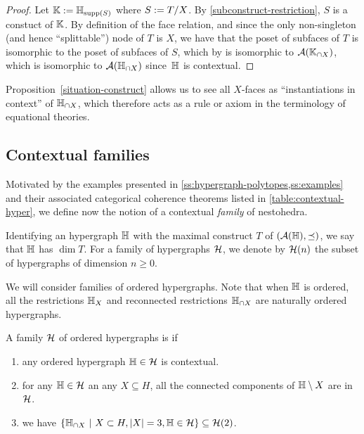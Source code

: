 \begin{proof} 
  Let ${\mathbb K}:={\mathbb H}_{\operatorname{supp}(S)}$ where $S:=T/X$. 
  By \cref{subconstruct-restriction}, $S$ is a constuct of ${\mathbb K}$. By definition of the face relation, and since the only non-singleton (and hence ``splittable'') node of $T$ is $X$, we have that the poset of subfaces of $T$ is isomorphic to the poset of subfaces of $S$, which by  is isomorphic to ${\cal A}({\mathbb K}_{\cap X})$, which is isomorphic to ${\cal A}({\mathbb H}_{\cap X})$ since~${\mathbb H}$ is contextual.
\end{proof}

Proposition~\ref{situation-construct} allows us to see all $X$-faces as ``instantiations in context'' of ${\mathbb H}_{\cap X}$, which therefore acts  as a rule or axiom in the terminology of equational theories.



\subsection{Contextual families}

Motivated by the examples presented in \cref{ss:hypergraph-polytopes,ss:examples} and their associated categorical coherence theorems listed in \cref{table:contextual-hyper}, we define now the notion of a contextual \emph{family} of nestohedra.

Identifying an hypergraph ${\mathbb H}$ with the maximal construct $T$ of $({\cal A}({\mathbb H}),\preceq)$, we say that ${\mathbb H}$ has  $\dim T$.
For a family of hypergraphs $\mathcal{H}$, we denote by $\mathcal{H}(n)$ the subset of hypergraphs of dimension $n \geq 0$.

We will consider families of ordered hypergraphs. 
Note that when ${\mathbb H}$ is ordered, all the restrictions ${\mathbb H}_X$ and reconnected restrictions ${\mathbb H}_{\cap X}$ are naturally ordered hypergraphs.

\begin{definition}
  \label{def:contextual-family}
    A family $\mathcal{H}$ of ordered hypergraphs is  if 
    \begin{enumerate}
      \item any ordered hypergraph ${\mathbb H} \in \mathcal{H}$ is contextual.
      \item for any ${\mathbb H} \in \mathcal{H}$ an any $X \subseteq H$, all the connected components of ${\mathbb H}\setminus X$ are in $\mathcal{H}$.
      \item we have $\{{\mathbb H}_{\cap X} \ | \ X \subset H, |X|=3, {\mathbb H} \in \mathcal{H} \} \subseteq \mathcal{H}(2)$.
    \end{enumerate}
\end{definition}

